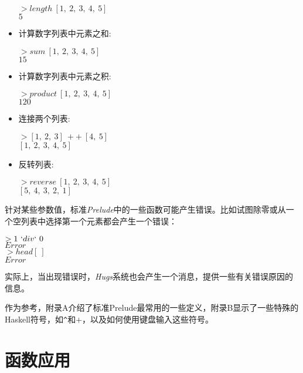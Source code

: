 \begin{itemize}
\noindent\hspace*{1cm} $> length~[1,~2,~3,~4,~5]$\\
\hspace*{1cm} $5$

\item 计算数字列表中元素之和:

\noindent\hspace*{1cm} $> sum~[1,~2,~3,~4,~5]$\\
\hspace*{1cm} $15$

\item 计算数字列表中元素之积:

\noindent\hspace*{1cm} $> product~[1,~2,~3,~4,~5]$\\
\hspace*{1cm} $120$

\item 连接两个列表:

\noindent\hspace*{1cm} $> [1,~2,~3]~++~[4,~5]$\\
\hspace*{1cm} $[1,~2,~3,~4,~5]$

\item 反转列表:

\noindent\hspace*{1cm} $> reverse~[1,~2,~3,~4,~5]$\\
\hspace*{1cm} $[5,~4,~3,~2,~1]$

\end{itemize}

针对某些参数值，标准\textit{Prelude}中的一些函数可能产生错误。比如试图除零或从一个空列表中选择第一个元素都会产生一个错误：

\noindent\hspace*{1cm} $> 1~`div`~0$\\
\hspace*{1cm} $Error$\\
\hspace*{1cm} $> head [~]$\\
\hspace*{1cm} $Error$

实际上，当出现错误时，\textit{Hugs}系统也会产生一个消息，提供一些有关错误原因的信息。

作为参考，附录A介绍了标准Prelude最常用的一些定义，附录B显示了一些特殊的Haskell符号，如\verb|^|和$+$，以及如何使用键盘输入这些符号。

\section{函数应用}

